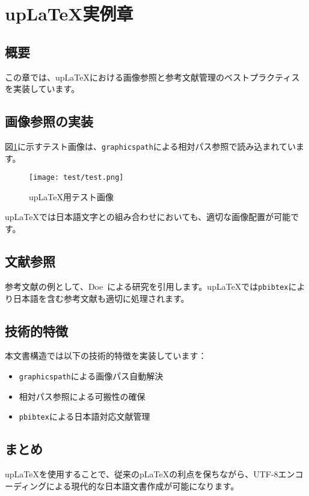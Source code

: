 \section{upLaTeX実例章}

\subsection{概要}

この章では、upLaTeXにおける画像参照と参考文献管理のベストプラクティスを実装しています。

\subsection{画像参照の実装}

図\ref{fig:test_image_up}に示すテスト画像は、\texttt{graphicspath}による相対パス参照で読み込まれています。

\begin{figure}[htbp]
    \centering
    \texttt{[image: test/test.png]}
    \caption{upLaTeX用テスト画像}
    \label{fig:test_image_up}
\end{figure}

upLaTeXでは日本語文字との組み合わせにおいても、適切な画像配置が可能です。

\subsection{文献参照}

参考文献の例として、Doe~\cite{example}による研究を引用します。upLaTeXでは\texttt{pbibtex}により日本語を含む参考文献も適切に処理されます。

\subsection{技術的特徴}

本文書構造では以下の技術的特徴を実装しています：

\begin{itemize}
    \item \texttt{graphicspath}による画像パス自動解決
    \item 相対パス参照による可搬性の確保
    \item \texttt{pbibtex}による日本語対応文献管理
\end{itemize}

\subsection{まとめ}

upLaTeXを使用することで、従来のpLaTeXの利点を保ちながら、UTF-8エンコーディングによる現代的な日本語文書作成が可能になります。
